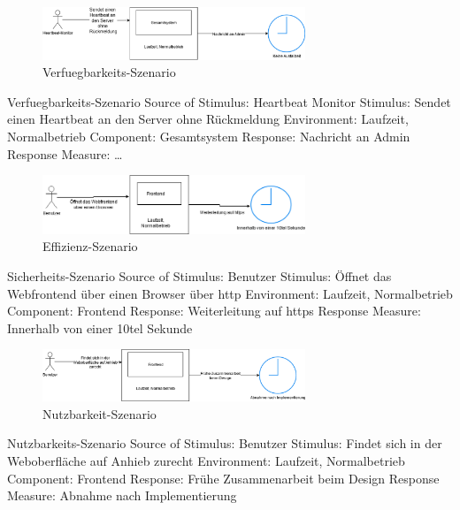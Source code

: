 \documentclass[12pt]{article}
\begin{document}
\begin{figure}[tbh]
  \centering
  \includegraphics[width=0.7\textwidth]{Bilder/Verfuegbarkeit.png}
  \caption{Verfuegbarkeits-Szenario}
  \label{fig:Qualitaet1}
\end{figure}

Verfuegbarkeits-Szenario
Source of Stimulus: Heartbeat Monitor
Stimulus: Sendet einen Heartbeat an den Server ohne Rückmeldung
Environment: Laufzeit, Normalbetrieb
Component: Gesamtsystem
Response: Nachricht an Admin
Response Measure: …




\begin{figure}[tbh]
  \centering
  \includegraphics[width=0.7\textwidth]{Bilder/Sicherheit.png}
  \caption{Effizienz-Szenario}
  \label{fig:Qualitaet2}
\end{figure}


Sicherheits-Szenario
Source of Stimulus: Benutzer
Stimulus: Öffnet das Webfrontend über einen Browser über http
Environment: Laufzeit, Normalbetrieb
Component: Frontend
Response: Weiterleitung auf https
Response Measure: Innerhalb von einer 10tel Sekunde




\begin{figure}[tbh]
  \centering
  \includegraphics[width=0.7\textwidth]{Bilder/Nutzbarkeit.png}
  \caption{Nutzbarkeit-Szenario}
  \label{fig:Qualitaet3}
\end{figure}



Nutzbarkeits-Szenario
Source of Stimulus: Benutzer
Stimulus: Findet sich in der Weboberfläche auf Anhieb zurecht
Environment: Laufzeit, Normalbetrieb
Component: Frontend
Response: Frühe Zusammenarbeit beim Design
Response Measure: Abnahme nach Implementierung
\end{document}
